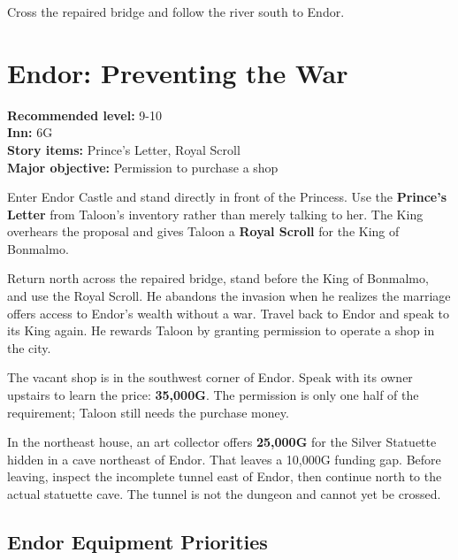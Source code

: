 \documentclass[
  american,
  10pt,
  letterpaper,
  oneside,
  open=any]{scrreprt}
\begin{document}
Cross the repaired bridge and follow the river south to Endor.

\section{Endor: Preventing the War}\label{endor-preventing-the-war}

\textbf{Recommended level:} 9-10\\
\textbf{Inn:} 6G\\
\textbf{Story items:} Prince's Letter, Royal Scroll\\
\textbf{Major objective:} Permission to purchase a shop

Enter Endor Castle and stand directly in front of the Princess. Use the
\textbf{Prince's Letter} from Taloon's inventory rather than merely
talking to her. The King overhears the proposal and gives Taloon a
\textbf{Royal Scroll} for the King of Bonmalmo.

Return north across the repaired bridge, stand before the King of
Bonmalmo, and use the Royal Scroll. He abandons the invasion when he
realizes the marriage offers access to Endor's wealth without a war.
Travel back to Endor and speak to its King again. He rewards Taloon by
granting permission to operate a shop in the city.

The vacant shop is in the southwest corner of Endor. Speak with its
owner upstairs to learn the price: \textbf{35,000G}. The permission is
only one half of the requirement; Taloon still needs the purchase money.

In the northeast house, an art collector offers \textbf{25,000G} for the
Silver Statuette hidden in a cave northeast of Endor. That leaves a
10,000G funding gap. Before leaving, inspect the incomplete tunnel east
of Endor, then continue north to the actual statuette cave. The tunnel
is not the dungeon and cannot yet be crossed.

\subsection{Endor Equipment
Priorities}\label{endor-equipment-priorities}
\end{document}
